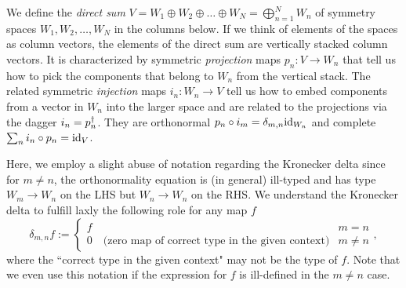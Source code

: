We define the \emph{direct sum} $V = W_1 \oplus W_2 \oplus \dots \oplus W_N = \bigoplus_{n=1}^N W_n$ of symmetry spaces $W_1, W_2, \dots, W_N$ in the columns below.
%
If we think of elements of the spaces as column vectors, the elements of the direct sum are vertically stacked column vectors.
%
It is characterized by symmetric \emph{projection} maps $p_n: V \to W_n$ that tell us how to pick the components that belong to $W_n$ from the vertical stack.
The related symmetric \emph{injection} maps $i_n : W_n \to V$ tell us how to embed components from a vector in $W_n$ into the larger space and are related to the projections via the dagger $i_n = p_n^\dagger$.
%
They are orthonormal $p_n \circ i_m = \delta_{m,n} \mathrm{id}_{W_n}$ and complete $\sum_n i_n \circ p_n = \mathrm{id}_{V}$.

Here, we employ a slight abuse of notation regarding the Kronecker delta since for $m \neq n$, the orthonormality equation is (in general) ill-typed and has type $W_m \to W_n$ on the LHS but $W_n \to W_n$ on the RHS.
%
We understand the Kronecker delta to fulfill laxly the following role for any map $f$
\begin{equation}
    \label{eq:nonabelian:basics:Kronecker_notation_abuse}
    \delta_{m,n} f 
    := \begin{cases}
        f & m = n
        \\
        0 \quad \text{(zero map of correct type in the given context)} & m \neq n
    \end{cases}
    ,
\end{equation}
where the ``correct type in the given context" may not be the type of $f$.
%
Note that we even use this notation if the expression for $f$ is ill-defined in the $m \neq n$ case.

